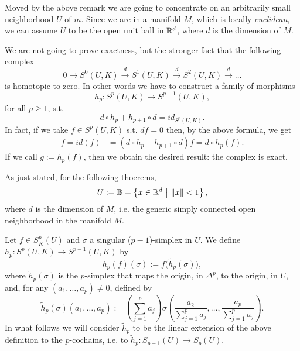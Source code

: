 \begin{rem}
	Moved by the above remark we are going to concentrate on an arbitrarily small neighborhood $U$ of $m$.
	Since we are in a manifold $M$, which is locally \textit{euclidean}, we can assume $U$ to be the open unit ball in $\mathbb{R}^d$, where $d$ is the dimension of $M$.

	We are not going to prove exactness, but the stronger fact that the following complex
	\begin{equation}
		0 \to S^0(U,K) \xrightarrow{d} S^1(U,K) \xrightarrow{d} S^2(U,K) \xrightarrow{d} \dots
	\end{equation} 
	is homotopic to zero.
	In other words we have to construct a family of morphisms
	\begin{equation}
		h_p: S^p(U,K) \to S^{p-1}(U,K)
	,\end{equation} 
	for all $p \geq 1$, s.t.
	\begin{equation}
		d \circ h_p + h_{p+1} \circ d = id_{S^p(U,K)}
	.\end{equation} 
	In fact, if we take $f \in S^p \left(U, K\right)$ s.t. $df = 0$ then, by the above formula, we get
	\begin{align}
		f = id(f) &= (d \circ h_p + h_{p+1} \circ d) f = d \circ h_p (f)
	.\end{align} 
	If we call $g := h_p (f)$, then we obtain the desired result: the complex is exact.
\end{rem}

As just stated, for the following thoerems, 
\begin{equation}
	U := \mathbb{B} = \left\{ x \in \R^d \ \middle|\ \norm{x} < 1 \right\}
,\end{equation} 
where $d$ is the dimension of $M$, i.e. the generic simply connected open neighborhood in the manifold $M$.

\begin{defn}[]
	Let $f \in S^p_K(U)$ and $\sigma$ a singular ($p-1$)-simplex in $U$.
	We define $h_p: S^p(U,K) \to S^{p-1}(U,K)$ by
	\begin{equation}
		h_p (f) (\sigma) := f\big(\widetilde{h}_p (\sigma)\big)	
	,\end{equation} 
	where $\widetilde{h}_p(\sigma)$ is the $p$-simplex that maps the origin, in $\Delta^p$, to the origin, in $U$, and, for any $(a_1, \ldots, a_p) \neq 0$, defined by
	\begin{equation}
		\widetilde{h}_p(\sigma) (a_1, \ldots, a_p) := \left( \sum_{j=1}^{p} a_j \right) \sigma \left(\frac{a_2}{\sum_{j=1}^{p} a_j}, \ldots, \frac{a_p}{\sum_{j=1}^{p} a_j} \right)
	.\end{equation}
	In what follows we will consider $\widetilde{h}_p$ to be the linear extension of the above definition to the $p$-cochains, i.e. to $\widetilde{h}_p: S_{p-1}(U) \to S_p(U)$.
\end{defn}

